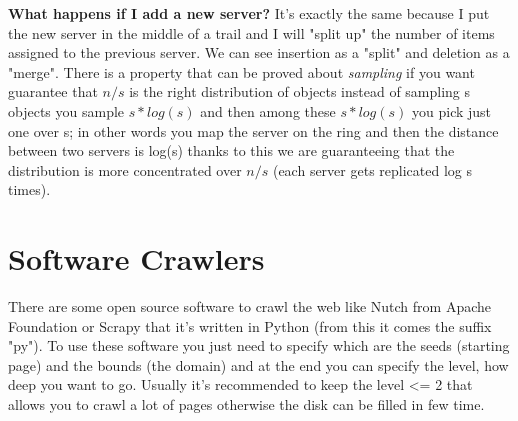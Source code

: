 \textbf{What happens if I add a new server?} It's exactly the same because I put the new server in the middle of a trail and I will "split up" the number of items assigned to the previous server. We can see insertion as a "split" and deletion as a "merge".\newline
There is a property that can be proved about \textit{sampling} if you want guarantee that $n/s$ is the right distribution of objects instead of sampling s objects you sample $s*log(s)$ and then among these $s*log(s)$ you pick just one over s; in other words you map the server on the ring and then the distance between two servers is log(s) thanks to this we are guaranteeing that the distribution is more concentrated over $n/s$ (each server gets replicated log s times).\newline
\section{Software Crawlers}
There are some open source software to crawl the web like Nutch from Apache Foundation or Scrapy that it's written in Python (from this it comes the suffix "py"). To use these software you just need to specify which are the seeds (starting page) and the bounds (the domain) and at the end you can specify the level, how deep you want to go. Usually it's recommended to keep the level <= 2 that allows you to crawl a lot of pages otherwise the disk can be filled in few time.